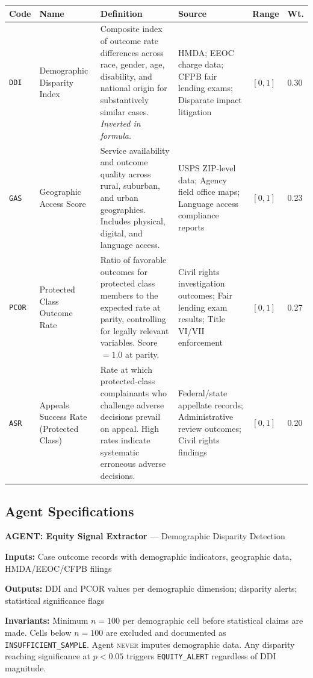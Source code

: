 \documentclass[a4paper,11pt]{article}
\begin{document}
	\begin{longtable}{L{1.1cm} L{1.9cm} L{4.5cm} L{3.5cm} C{1.1cm} C{1.1cm}}
		\toprule
		\color{white}\textbf{\sffamily Code} & \color{white}\textbf{\sffamily Name} & \color{white}\textbf{\sffamily Definition} & \color{white}\textbf{\sffamily Source} & \color{white}\textbf{\sffamily Range} & \color{white}\textbf{\sffamily Wt.} \\
		\midrule
		\endhead
		\texttt{DDI} & Demographic Disparity Index & Composite index of outcome rate differences across race, gender, age, disability, and national origin for substantively similar cases. \textit{Inverted in formula.} & HMDA; EEOC charge data; CFPB fair lending exams; Disparate impact litigation & $[0,1]$ & 0.30 \\
		\midrule
		\texttt{GAS} & Geographic Access Score & Service availability and outcome quality across rural, suburban, and urban geographies. Includes physical, digital, and language access. & USPS ZIP-level data; Agency field office maps; Language access compliance reports & $[0,1]$ & 0.23 \\
		\midrule
		\texttt{PCOR} & Protected Class Outcome Rate & Ratio of favorable outcomes for protected class members to the expected rate at parity, controlling for legally relevant variables. Score $= 1.0$ at parity. & Civil rights investigation outcomes; Fair lending exam results; Title VI/VII enforcement & $[0,1]$ & 0.27 \\
		\midrule
		\texttt{ASR} & Appeals Success Rate (Protected Class) & Rate at which protected-class complainants who challenge adverse decisions prevail on appeal. High rates indicate systematic erroneous adverse decisions. & Federal/state appellate records; Administrative review outcomes; Civil rights findings & $[0,1]$ & 0.20 \\
		\bottomrule
	\end{longtable}
	
	\subsection{Agent Specifications}
	
	\begin{agentbox}
		\textbf{\sffamily\color{navy} AGENT: Equity Signal Extractor} — Demographic Disparity Detection
		
		\medskip
		\textbf{Inputs:} Case outcome records with demographic indicators, geographic data, HMDA/EEOC/CFPB filings
		
		\textbf{Outputs:} DDI and PCOR values per demographic dimension; disparity alerts; statistical significance flags
		
		\textbf{Invariants:} Minimum $n = 100$ per demographic cell before statistical claims are made. Cells below $n = 100$ are excluded and documented as \texttt{INSUFFICIENT\_SAMPLE}. Agent \textsc{never} imputes demographic data. Any disparity reaching significance at $p < 0.05$ triggers \texttt{EQUITY\_ALERT} regardless of DDI magnitude.
	\end{agentbox}
	
\end{document}
